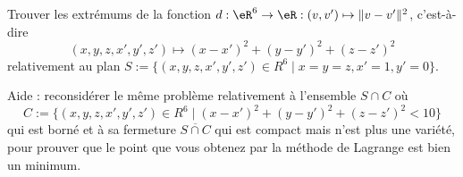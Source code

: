 
\begin{exercice}\label{exoVariete0004}

Trouver les extrémums de la fonction $d:\eR^6 \rightarrow \eR: (v,v') \mapsto \|v-v'\|^2$, c'est-à-dire
\begin{equation}
	(x,y,z,x',y',z') \mapsto (x-x')^2+(y-y')^2+(z- z')^2
\end{equation}
relativement au plan $S :=\{ (x,y,z,x',y',z') \in R^6 \mid x=y=z, x'=1, y'=0 \}$.

Aide : reconsidérer le même problème relativement à l'ensemble $S\cap C$ où
\begin{equation}
	C :=\{ (x,y,z,x',y',z') \in R^6 \mid (x-x')^2+(y-y')^2+(z- z')^2<10 \}
\end{equation}
qui est borné et à sa fermeture $\overline{S \cap C}$ qui est compact mais n'est plus une variété, pour prouver que le point que vous obtenez par la méthode de Lagrange est bien un minimum.


\end{exercice}
